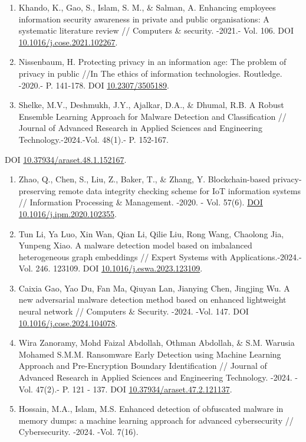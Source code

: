 \begin{enumerate}
\def\labelenumi{\arabic{enumi}.}
\item
  Khando, K., Gao, S., Islam, S. M., \& Salman, A. Enhancing employees
  information security awareness in private and public organisations: A
  systematic literature review // Computers \& security. -2021.- Vol.
  106. DOI
  \href{https://doi.org/10.1016/j.cose.2021.102267}{10.1016/j.cose.2021.102267}.
\item
  Nissenbaum, H. Protecting privacy in an information age: The problem
  of privacy in public //In The ethics of information technologies.
  Routledge. -2020.- P. 141-178. DOI
  \href{https://doi.org/10.2307/3505189}{10.2307/3505189}.
\item
  Shelke, M.V., Deshmukh, J.Y., Ajalkar, D.A., \& Dhumal, R.B. A Robust
  Ensemble Learning Approach for Malware Detection and Classification //
  Journal of Advanced Research in Applied Sciences and Engineering
  Technology.-2024.-Vol. 48(1).- P. 152-167.
\end{enumerate}

DOI
\href{https://doi.org/10.37934/araset.48.1.152167}{10.37934/araset.48.1.152167}.

\begin{enumerate}
\def\labelenumi{\arabic{enumi}.}
\setcounter{enumi}{3}
\item
  Zhao, Q., Chen, S., Liu, Z., Baker, T., \& Zhang, Y. Blockchain-based
  privacy-preserving remote data integrity checking scheme for IoT
  information systems // Information Processing \& Management. -2020. -
  Vol. 57(6). \href{https://doi.org/10.1016/j.ipm.2020.102355}{DOI
  10.1016/j.ipm.2020.102355}.
\item
  Tun Li, Ya Luo, Xin Wan, Qian Li, Qilie Liu, Rong Wang, Chaolong Jia,
  Yunpeng Xiao. A malware detection model based on imbalanced
  heterogeneous graph embeddings // Expert Systems with
  Applications.-2024.-Vol. 246. 123109. DOI
  \href{https://doi.org/10.1016/j.eswa.2023.123109}{10.1016/j.eswa.2023.123109}.
\item
  Caixia Gao, Yao Du, Fan Ma, Qiuyan Lan, Jianying Chen, Jingjing Wu. A
  new adversarial malware detection method based on enhanced lightweight
  neural network // Computers \& Security. -2024. -Vol. 147. DOI
  \href{https://doi.org/10.1016/j.cose.2024.104078}{10.1016/j.cose.2024.104078}.
\item
  Wira Zanoramy, Mohd Faizal Abdollah, Othman Abdollah, \& S.M. Warusia
  Mohamed S.M.M. Ransomware Early Detection using Machine Learning
  Approach and Pre-Encryption Boundary Identification // Journal of
  Advanced Research in Applied Sciences and Engineering Technology.
  -2024. -Vol. 47(2).- P. 121 - 137. DOI
  \href{https://doi.org/10.37934/araset.47.2.121137}{10.37934/araset.47.2.121137}.
\item
  Hossain, M.A., Islam, M.S. Enhanced detection of obfuscated malware in
  memory dumps: a machine learning approach for advanced cybersecurity
  // Cybersecurity. -2024. -Vol. 7(16).
\end{enumerate}

